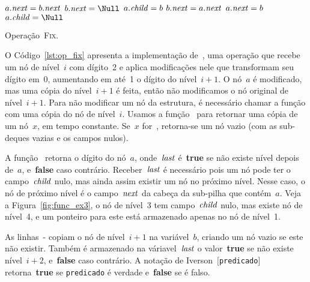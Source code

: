 \documentclass[../../main.tex]{subfiles}
\begin{document}
\begin{algorithm}
\begin{algorithmic}[1]
          \label{line:fix:next_a_bb}
            \State $a.\mathit{next} = b.\mathit{next}$
            \State $b.\V{next} = \Null$ \label{line:fix:next_a_be}
        \EndIf
        \State $a.\mathit{child} = b$ \label{line:fix:child_a_b}
    \Else
         \label{line:fix:next_b_ab}
            \State $b.\mathit{next} = a.\mathit{next}$  \label{line:fix:next_b_ae}
        \EndIf
        \State $a.\mathit{next} = b$ \label{line:fix:child_b_ab}
        \State $a.\V{child} = \Null$  \label{line:fix:child_b_ae}
    \EndIf
\EndFunction

\end{algorithmic}
\caption{Operação~\textsc{Fix}.} \label{lst:op_fix}
\end{algorithm}

O Código~\ref{lst:op_fix} apresenta a implementação de~, uma operação que recebe um nó de nível~$i$ com dígito~2 e aplica modificações nele que transformam seu dígito em~0, aumentando em até~1 o dígito do nível~$i+1$. O nó~$a$ é modificado, mas uma cópia do nível~$i+1$ é feita, então não modificamos o nó original de nível~$i+1$. Para não modificar um nó da estrutura, é necessário chamar a função com uma cópia do nó de nível~$i$. Usamos a função~ para retornar uma cópia de um nó~$x$, em tempo constante. Se~$x$ for~, retorna-se um nó vazio (com as sub-deques vazias e os campos nulos).

A função~ retorna o dígito do nó~$a$, onde~$\mathit{last}$ é~\textbf{true} se não existe nível depois de~$a$, e~\textbf{false} caso contrário. Receber~$\mathit{last}$ é necessário pois um nó pode ter o campo~$\mathit{child}$ nulo, mas ainda assim existir um nó no próximo nível. Nesse caso, o nó de próximo nível é o campo~$\mathit{next}$ da cabeça da sub-pilha que contém~$a$. Veja a Figura~\ref{fig:func_ex3}, o nó de nível~3 tem campo~$\mathit{child}$ nulo, mas existe nó de nível~4, e um ponteiro para este está armazenado apenas no nó de nível~1.

As linhas~{-} copiam o nó de nível~$i+1$ na variável~$b$, criando um nó vazio se este não existir.
Também é armazenado na váriavel~$\mathit{last}$ o valor~\textbf{true} se não existe nível~$i+2$, e~\textbf{false} caso contrário. A notação de Iverson~$[$\texttt{predicado}$]$ retorna~\textbf{true} se \texttt{predicado} é verdade e~\textbf{false} se é falso.
\end{document}
